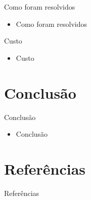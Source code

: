 \documentclass[11pt]{beamer}
\begin{document}
\begin{frame}{Como foram resolvidos}

\begin{itemize}
	\item Como foram resolvidos
\end{itemize}

\end{frame}

\begin{frame}{Custo}

\begin{itemize}
	\item Custo
\end{itemize}

\end{frame}

\section{Conclusão}
\begin{frame}{Conclusão}

\begin{itemize}
	\item Conclusão
\end{itemize}

\end{frame}

\section{Referências}
\begin{frame}{Referências}

\end{frame}
\end{document}
